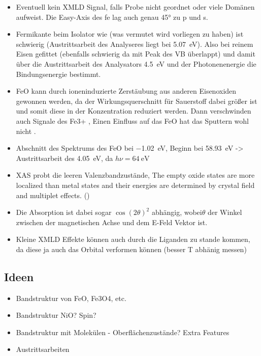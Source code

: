 \begin{itemize}
            \item Eventuell kein XMLD Signal, falls Probe nicht geordnet oder viele Domänen aufweist. Die Easy-Axis des fe lag auch genau 45° zu p und s.
            \item Fermikante beim Isolator wie  (was vermutet wird vorliegen zu haben) ist schwierig (Austrittsarbeit des Analyseres liegt bei \SI{5.07}{\electronvolt}). Also bei reinem Eisen gefittet (ebenfalls schwierig da mit Peak des VB überlappt) und damit über die Austrittsarbeit des Analysators \SI{4.5}{\electronvolt} und der Photonenenergie die Bindungsenergie bestimmt.
            \item FeO kann durch ioneninduzierte Zerstäubung aus anderen Eisenoxiden gewonnen werden, da der Wirkungsquerschnitt für Sauerstoff dabei größer ist und somit diese in der Konzentration reduziert werden. \cite{FeO_12}
                  Dann verschwinden auch Signale des Fe3+ \cite{FeO_15}, Einen Einfluss auf das FeO hat das Sputtern wohl nicht \cite{FeO_12, FeO_15}.
            \item Abschnitt des Spektrums des FeO bei \SI{-1.02}{\electronvolt}, Beginn bei \SI{58.93}{\electronvolt} -> Austrittsarbeit des  \SI{4.05}{\electronvolt}, da $h\nu = \SI{64}{\electronvolt}$
            \item XAS probt die leeren Valenzbandzustände,  The empty oxide states are more localized than metal states and their energies are determined by crystal field and multiplet effects. (\cite{XMCD_XMLD})
            \item Die Absorption ist dabei sogar $\cos(2\theta)^2$ abhängig, wobei$\theta$ der Winkel zwischen der magnetischen Achse und dem E-Feld Vektor ist.
            \item Kleine XMLD Effekte können auch durch die Liganden zu stande kommen, da diese ja auch das Orbital verformen können (besser T abhänig messen)
        \end{itemize}

    \subsection{Ideen}
    \begin{itemize}
        \item Bandstruktur von FeO, Fe3O4, etc.
        \item Bandstruktur NiO? Spin?
        \item Bandstruktur mit Molekülen - Oberflächenzustände? Extra Features
        \item Austrittsarbeiten
    \end{itemize}


